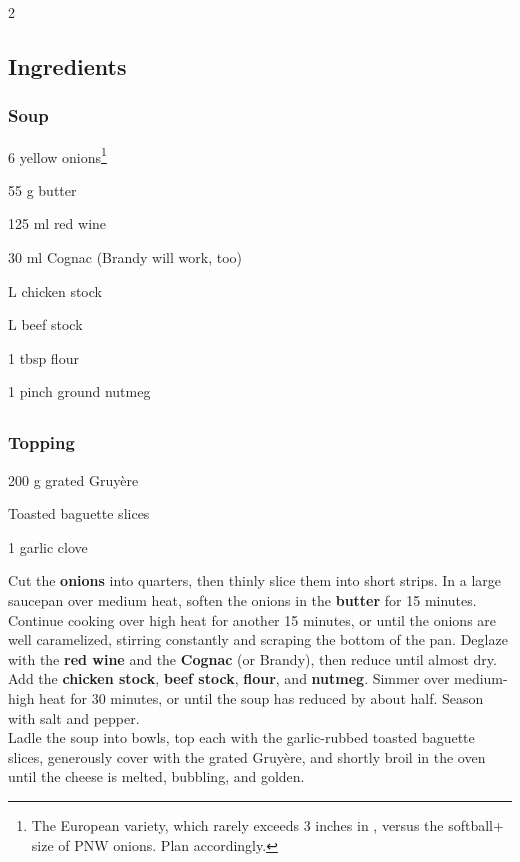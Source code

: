 \newpage
{}

\begin{multicols}{2}
	\subsection*{Ingredients}
	\subsubsection*{Soup}
	\begin{ingredients}
		\item 6 yellow onions\footnote{The European variety, which rarely exceeds 3 inches in \diameter , versus the softball+ size of PNW onions. Plan accordingly.}
		\item 55 g butter
		\item 125 ml red wine
		\item 30 ml Cognac (Brandy will work, too)
		\item {} L chicken stock
		\item {} L beef stock
		\item 1 tbsp flour
		\item 1 pinch ground nutmeg
	\end{ingredients}
	
	\columnbreak
	
	\subsection*{}
	\subsubsection*{Topping}
	\begin{ingredients}
		\item 200 g grated Gruyère
		\item Toasted baguette slices
		\item 1 garlic clove
	\end{ingredients}
	\vfill
\end{multicols}

\medskip

Cut the \textbf{onions} into quarters, then thinly slice them into short strips.
In a large saucepan over medium heat, soften the onions in the \textbf{butter} for 15 minutes.
Continue cooking over high heat for another 15 minutes, or until the onions are well caramelized, stirring constantly and scraping the bottom of the pan.
Deglaze with the \textbf{red wine} and the \textbf{Cognac} (or Brandy), then reduce until almost dry.
Add the \textbf{chicken stock}, \textbf{beef stock}, \textbf{flour}, and \textbf{nutmeg}.
Simmer over medium-high heat for 30 minutes, or until the soup has reduced by about half.
Season with salt and pepper. \\

Ladle the soup into bowls, top each with the garlic-rubbed toasted baguette slices, generously cover with the grated Gruyère, and shortly broil in the oven until the cheese is melted, bubbling, and golden.

\vspace*{0.75 cm}

\begin{recipeblock}
	
\end{recipeblock}